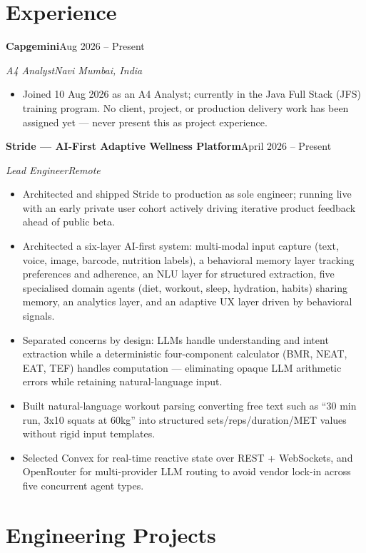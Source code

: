 \documentclass[a4paper,11pt]{article}
\newcommand{\entry}[2]{\noindent\textbf{#1}\hfill{#2}\par}
\newcommand{\subentry}[2]{\noindent\textit{#1}\hfill{\textit{#2}}\par\vspace{2pt}}
\begin{document}
\section{Experience}
\entry{Capgemini}{Aug 2026 -- Present}
\subentry{A4 Analyst}{Navi Mumbai, India}
\begin{itemize}
  \item Joined 10 Aug 2026 as an A4 Analyst; currently in the Java Full Stack (JFS) training program. No client, project, or production delivery work has been assigned yet --- never present this as project experience.
\end{itemize}
\vspace{2pt}
\entry{Stride --- AI-First Adaptive Wellness Platform}{April 2026 -- Present}
\subentry{Lead Engineer}{Remote}
\begin{itemize}
  \item Architected and shipped Stride to production as sole engineer; running live with an early private user cohort actively driving iterative product feedback ahead of public beta.
  \item Architected a six-layer AI-first system: multi-modal input capture (text, voice, image, barcode, nutrition labels), a behavioral memory layer tracking preferences and adherence, an NLU layer for structured extraction, five specialised domain agents (diet, workout, sleep, hydration, habits) sharing memory, an analytics layer, and an adaptive UX layer driven by behavioral signals.
  \item Separated concerns by design: LLMs handle understanding and intent extraction while a deterministic four-component calculator (BMR, NEAT, EAT, TEF) handles computation --- eliminating opaque LLM arithmetic errors while retaining natural-language input.
  \item Built natural-language workout parsing converting free text such as ``30 min run, 3x10 squats at 60kg'' into structured sets/reps/duration/MET values without rigid input templates.
  \item Selected Convex for real-time reactive state over REST + WebSockets, and OpenRouter for multi-provider LLM routing to avoid vendor lock-in across five concurrent agent types.
\end{itemize}

\section{Engineering Projects}
\end{document}
